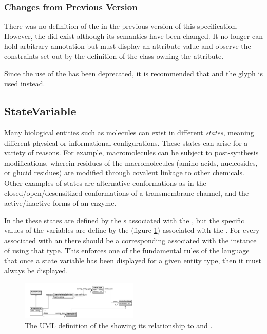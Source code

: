 \subsubsection{Changes from Previous Version}

There was no definition of the  in the
previous version of this specification. However, the  did exist although its semantics have been changed. It
no longer can hold arbitrary annotation but must display an attribute
value and observe the constraints set out by the definition of the
class owning the attribute.

Since the use of the  has been deprecated,
it is recommended that  and the
 glyph is used instead.

\subsection{StateVariable}
\label{defn:StateVariable}

Many biological entities such as molecules can exist in different
\emph{states}, meaning different physical or informational
configurations.  These states can arise for a variety of reasons.  For
example, macromolecules can be subject to post-synthesis
modifications, wherein residues of the macromolecules (amino acids,
nucleosides, or glucid residues) are modified through covalent linkage
to other chemicals.  Other examples of states are alternative
conformations as in the closed/open/desensitized conformations of a
transmembrane channel, and the active/inactive forms of an enzyme.

In the \PDl these states are defined by the
s associated with the
, but the specific values of the variables are
define by the  (figure
\ref{fig:statevariableviewuml}) associated with the
. For every
 associated with an
 there should be a corresponding
 associated with the instance of
 using that type. This enforces one of the
fundamental rules of the language that once a state variable has been
displayed for a given entity type, then it must always be displayed.

\begin{figure}[htb]
  \centering
  \includegraphics[width = 0.5\textwidth]{images/statevariableviewuml}
  \caption{The UML definition of the  showing
    its relationship to  and .}
  \label{fig:statevariableviewuml}
\end{figure}

